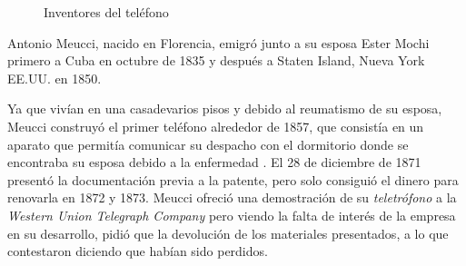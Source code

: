 \begin{figure}[h!btp]
	\begin{adjustbox}{minipage=\linewidth, fbox}
		\centering
		\hspace{10mm}
	\end{adjustbox}
\caption{Inventores del teléfono}
	\label{fig:teléfono}
\end{figure}

Antonio Meucci, nacido en Florencia, emigró junto a su esposa Ester Mochi primero a Cuba en octubre de 1835 y después a Staten Island, Nueva York \ac{EE.UU.} en 1850.

Ya que vivían en una casadevarios pisos y debido al reumatismo de su esposa, Meucci construyó el primer teléfono alrededor de 1857, que consistía en un aparato que permitía comunicar su despacho con el  dormitorio donde se encontraba su esposa debido a la enfermedad \cite{Meuc10}. El 28 de diciembre de 1871 presentó la documentación previa a la patente, pero solo consiguió el dinero para renovarla en 1872 y 1873. Meucci ofreció una demostración de su \textit{teletrófono} a la \textit{Western Union Telegraph Company} pero viendo la falta de interés de la empresa en su desarrollo, pidió que la devolución de los materiales presentados, a lo que contestaron diciendo que habían sido perdidos.

